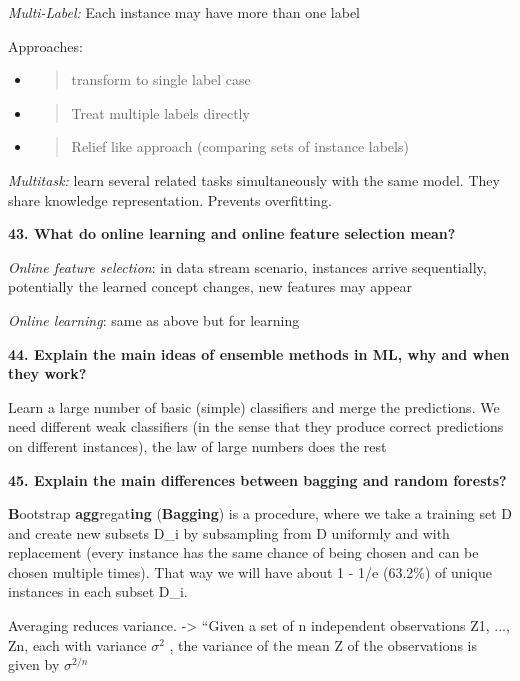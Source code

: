 \textit{Multi-Label:} Each instance may have more than one label

Approaches:

\begin{itemize}
\item
  \begin{quote}
  transform to single label case
  \end{quote}
\item
  \begin{quote}
  Treat multiple labels directly
  \end{quote}
\item
  \begin{quote}
  Relief like approach (comparing sets of instance labels)
  \end{quote}
\end{itemize}

\textit{Multitask:} learn several related tasks simultaneously with
the same model. They share knowledge representation. Prevents
overfitting.

\textbf{43. What do online learning and online feature selection mean?}

\textit{Online feature selection}: in data stream scenario, instances
arrive sequentially, potentially the learned concept changes, new
features may appear

\textit{Online learning}: same as above but for learning

\textbf{44. Explain the main ideas of ensemble methods in ML, why and
when they work?}

Learn a large number of basic (simple) classifiers and merge the
predictions. We need different weak classifiers (in the sense that they
produce correct predictions on different instances), the law of large
numbers does the rest

\textbf{45. Explain the main differences between bagging and random
forests?}

\textbf{B}ootstrap \textbf{agg}regat\textbf{ing} (\textbf{Bagging}) is a
procedure, where we take a training set D and create new subsets D\_i by
subsampling from D uniformly and with replacement (every instance has
the same chance of being chosen and can be chosen multiple times). That
way we will have about 1 - 1/e (63.2\%) of unique instances in each
subset D\_i.

Averaging reduces variance. -\textgreater{} ``Given a set of n
independent observations Z1, ..., Zn, each with variance $\sigma^2$ , the
variance of the mean Z of the observations is given by
$\sigma^{2/n}$

